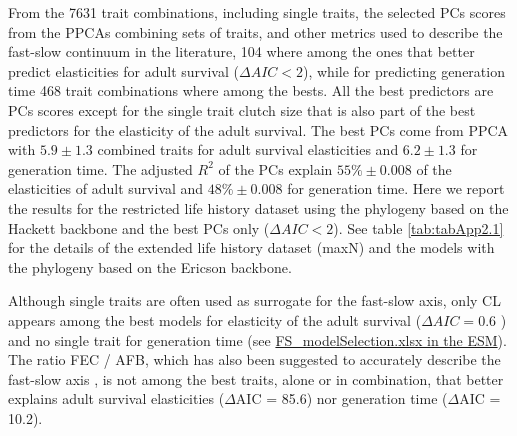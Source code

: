 From the 7631 trait combinations, including single traits, the selected PCs 
scores from the PPCAs combining sets of traits, and other metrics used to 
describe the fast-slow continuum in the literature, 104 where among 
the ones that better predict elasticities for adult survival ($\Delta AIC < 2$),
while for predicting generation time 468 trait combinations where among the
bests. All the best predictors are PCs scores except for the single trait clutch
size that is also part of the best predictors for the elasticity of the adult
survival.
The best PCs come from PPCA with $5.9 \pm 1.3$ combined traits for adult 
survival elasticities and $6.2 \pm 1.3$ for generation time. The adjusted $R^2$
of the PCs explain $55\% \pm 0.008$ of the elasticities of adult survival and
$48\% \pm 0.008$ for generation time. Here we report the results for the
restricted life history dataset using the phylogeny based on the Hackett
backbone and the best PCs only ($\Delta AIC < 2$). See table
\ref{tab:tabApp2.1} for the details of the extended life history dataset (maxN)
and the models with the phylogeny based on the Ericson backbone.

Although single traits are often used as surrogate for the fast-slow axis, only
CL appears among the best models for elasticity of the adult survival ($\Delta
AIC = 0.6$ ) and no single trait for generation time (see
\href{https://github.com/jmaspons/Thesis/tree/master/ESM/chapter02}{
FS\_modelSelection.xlsx in the ESM}). The ratio FEC / AFB, which has also been
suggested to accurately describe the fast-slow axis \citep{Oli2004}⁠, is not
among the best traits, alone or in combination, that better explains adult
survival elasticities ($\Delta$AIC = 85.6) nor generation time ($\Delta$AIC =
10.2).

